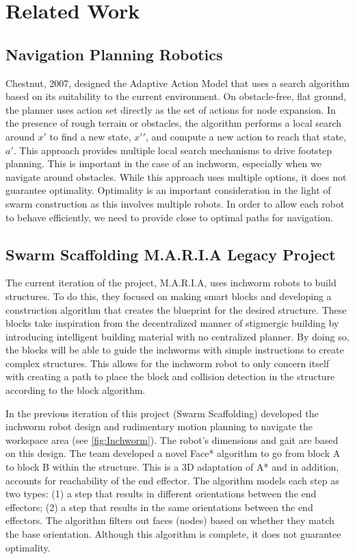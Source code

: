 \section{Related Work}

\subsection{Navigation Planning Robotics}
Chestnut, 2007, designed the Adaptive Action Model that uses a search algorithm based on its suitability to the current environment. On obstacle-free, flat ground, the planner uses action set directly as the set of actions for node expansion. In the presence of rough terrain or obstacles, the algorithm performs a local search around $x\prime$ to find a new state, $x\prime\prime$, and compute a new action to reach that state, $a\prime$. This approach provides multiple local search mechanisms to drive footstep planning. This is important in the case of an inchworm, especially when we navigate around obstacles. While this approach uses multiple options, it does not guarantee optimality. Optimality is an important consideration in the light of swarm construction as this involves multiple robots. In order to allow each robot to behave efficiently, we need to provide close to optimal paths for navigation. \cite{LeggedRobotsNavPlanning}

\subsection{Swarm Scaffolding M.A.R.I.A Legacy Project}

The current iteration of the project, M.A.R.I.A, uses inchworm robots to build structures. To do this, they focused on making smart blocks and developing a construction algorithm that creates the blueprint for the desired structure. These blocks take inspiration from the decentralized manner of stigmergic building by introducing intelligent building material with no centralized planner. By doing so, the blocks will be able to guide the inchworms with simple instructions to create complex structures. This allows for the inchworm robot to only concern itself with creating a path to place the block and collision detection in the structure according to the block algorithm. 

In the previous iteration of this project (Swarm Scaffolding) developed the inchworm robot design and rudimentary motion planning to navigate the workspace area (see \autoref{fig:Inchworm}). The robot’s dimensions and gait are based on this design. The team developed a novel Face* algorithm to go from block A to block B within the structure. This is a 3D adaptation of A* and in addition, accounts for reachability of the end effector. The algorithm models each step as two types: (1) a step that results in different orientations between the end effectors; (2) a step that results in the same orientations between the end effectors. The algorithm filters out faces (nodes) based on whether they match the base orientation. Although this algorithm is complete, it does not guarantee optimality. \cite{PastMQP}


